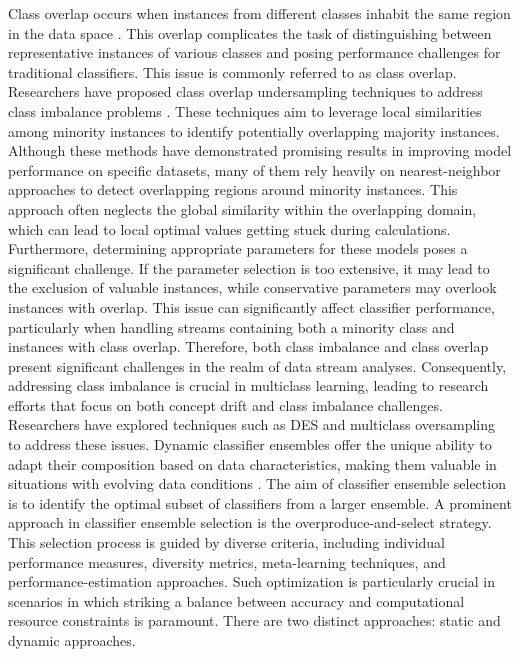 Class overlap occurs when instances from different classes inhabit the same region in the data space \cite{galar2011review}\cite{cruz2018dynamic}. This overlap complicates the task of distinguishing between representative instances of various classes and posing performance challenges for traditional classifiers. This issue is commonly referred to as class overlap. Researchers have proposed class overlap undersampling
techniques to address class imbalance problems \cite{kuncheva2000clustering}. These techniques aim to leverage local similarities among minority instances to
identify potentially overlapping majority instances. Although these methods have demonstrated promising results in improving model
performance on specific datasets, many of them rely heavily on nearest-neighbor approaches to detect overlapping regions around
minority instances. This approach often neglects the global similarity within the overlapping domain, which can lead to local optimal
values getting stuck during calculations. Furthermore, determining appropriate parameters for these models poses a significant
challenge. If the parameter selection is too extensive, it may lead to the exclusion of valuable instances, while conservative parameters
may overlook instances with overlap. This issue can significantly affect classifier performance, particularly when handling streams
containing both a minority class and instances with class overlap. Therefore, both class imbalance and class overlap present significant
challenges in the realm of data stream analyses. Consequently, addressing class imbalance is crucial in multiclass learning, leading to
research efforts that focus on both concept drift and class imbalance challenges. Researchers have explored techniques such as DES and
multiclass oversampling to address these issues.
Dynamic classifier ensembles offer the unique ability to adapt their composition based on data characteristics, making them
valuable in situations with evolving data conditions \cite{woloszynski2011probabilistic}. The aim of classifier ensemble selection is to identify the optimal subset of
classifiers from a larger ensemble. A prominent approach in classifier ensemble selection is the overproduce-and-select strategy. This
selection process is guided by diverse criteria, including individual performance measures, diversity metrics, meta-learning techniques,
and performance-estimation approaches. Such optimization is particularly crucial in scenarios in which striking a balance between
accuracy and computational resource constraints is paramount. There are two distinct approaches: static and dynamic approaches.
